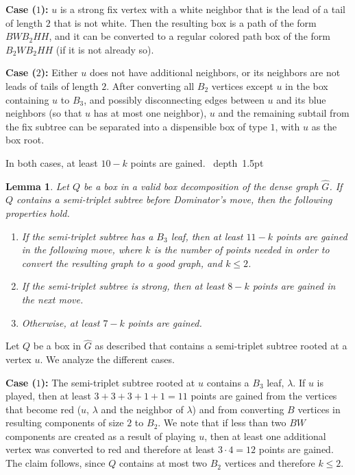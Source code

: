 \documentclass[11pt]{article}
\def\Proof{\par\noindent{\bf Proof:~}}
\def\blackslug{\hbox{\hskip 1pt \vrule width 4pt height 8pt
    depth 1.5pt \hskip 1pt}}
\def\QED{\quad\blackslug\lower 8.5pt\null\par}
\def\dnsitem{\vspace{-7pt}\item}
\newtheorem{lemma}[theorem]{Lemma}
\theoremstyle{definition}
\begin{document}
\smallskip
\par\noindent
{\bf Case ($1$):}
$u$ is a strong fix vertex with a white neighbor that is the lead of a tail of length $2$ that is not white. 
Then the resulting box is a path of the form $BWB_2HH$, and it can be converted to a regular colored path box of the form $B_2WB_2HH$ (if it is not already so).

\smallskip
\par\noindent
{\bf Case ($2$):}
Either $u$ does not have additional neighbors, or its neighbors are not leads of tails of length $2$.
After converting all $B_2$ vertices except $u$ in the box containing $u$ to $B_3$, and possibly disconnecting edges between $u$ and its blue neighbors (so that $u$ has at most one neighbor), 
$u$ and the remaining subtail from the fix subtree can be separated into a dispensible box of type $1$, with $u$ as the box root.

\smallskip
\par\noindent
In both cases, at least $10 - k$ points are gained.
\QED

\begin{lemma}
\label{lemma:semi_triplet_subtree_gain}
Let $Q$ be a box in a valid box decomposition of the dense graph $\hat{G}$.
If $Q$ contains a semi-triplet subtree before Dominator's move, then the following properties hold.
\begin{enumerate}
	\dnsitem If the semi-triplet subtree has a $B_3$ leaf, then at least $11 - k$ points are gained in the following move,
	where $k$ is the number of points needed in order to convert the resulting graph to a good graph, and $k \leq 2$.
	\dnsitem If the semi-triplet subtree is strong, then at least $8 - k$ points are gained in the next move.
	\dnsitem Otherwise, at least $7 - k$ points are gained.
\end{enumerate}
\end{lemma}
\Proof
Let $Q$ be a box in $\hat{G}$ as described that contains a semi-triplet subtree rooted at a vertex $u$.
We analyze the different cases.
\smallskip
\par\noindent
{\bf Case ($1$):}
The semi-triplet subtree rooted at $u$ contains a $B_3$ leaf, $\lambda$.
If $u$ is played, then at least $3 + 3 + 3 + 1 + 1 = 11$ points are gained from the vertices that become red ($u$, $\lambda$ and the neighbor of $\lambda$) and from converting $B$ vertices in resulting components of size $2$ to $B_2$. We note that if less than two $BW$ components are created as a result of playing $u$, then at least one additional vertex was converted to red and therefore at least $3 \cdot 4 = 12$ points are gained.
The claim follows, since $Q$ contains at most two $B_2$ vertices and therefore $k \leq 2$. 
\end{document}
